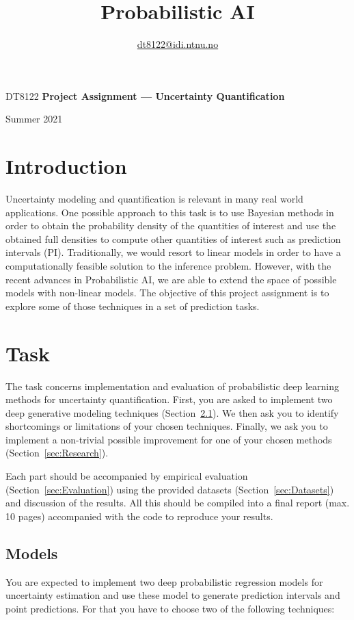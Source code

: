\documentclass[a4paper, 12pt]{article}
\begin{document}
\title{Probabilistic AI}{DT8122 \textbf{Project Assignment --- Uncertainty Quantification}}
\author{\textcolor{blue}{\href{mailto:dt8122@idi.ntnu.no}{dt8122@idi.ntnu.no}}}
\begin{center}
\vspace{-0.5cm}
Summer 2021
\end{center}


\section{Introduction}\label{sec:Introduction}
Uncertainty modeling and quantification is relevant in many real world applications. One possible
approach to this task is to use Bayesian methods in order to obtain the probability density of the
quantities of interest and use the obtained full densities to compute other quantities of interest
such as prediction intervals (PI). Traditionally, we would resort to linear models in order to have
a computationally feasible solution to the inference problem. However, with the recent advances in
Probabilistic AI, we are able to extend the space of possible models with non-linear models. The
objective of this project assignment is to explore some of those techniques in a set of prediction
tasks.

\section{Task}\label{sec:Task}
The task concerns implementation and evaluation of probabilistic deep learning methods for
uncertainty quantification. First, you are asked to implement two deep generative modeling
techniques (Section~\ref{sec:Models}). We then ask you to identify shortcomings or limitations of
your chosen techniques. Finally, we ask you to implement a non-trivial possible improvement for one
of your chosen methods (Section~\ref{sec:Research}).

Each part should be accompanied by empirical evaluation (Section~\ref{sec:Evaluation}) using the
provided datasets (Section~\ref{sec:Datasets}) and discussion of the results. All this should be
compiled into a final report (max. 10 pages) accompanied with the code to reproduce your results.

\subsection{Models}\label{sec:Models}
You are expected to implement two deep probabilistic regression models for uncertainty estimation
and use these model to generate prediction intervals and point predictions. For that you have to
choose two of the following techniques:
\end{document}
